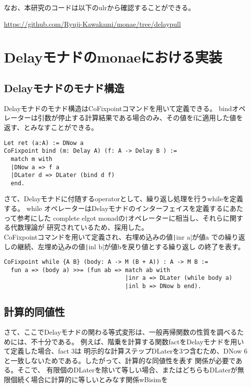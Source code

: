 \documentclass[japanese]{jssst_ppl}
\theoremstyle{definition}
\begin{document}
なお、本研究のコードは以下のulrから確認することができる。\\

\begin{center}
  \url{https://github.com/Ryuji-Kawakami/monae/tree/delaypull}
\end{center}


\section{Delayモナドのmonaeにおける実装}


\subsection{Delayモナドのモナド構造}

Delayモナドのモナド構造はCoFixpointコマンドを用いて定義できる。
bindオペレーターは引数が停止する計算結果である場合のみ、その値をfに適用した値を返す、とみなすことができる。
\begin{verbatim}
Let ret (a:A) := DNow a
CoFixpoint bind (m: Delay A) (f: A -> Delay B ) :=
  match m with
  |DNow a => f a
  |DLater d => DLater (bind d f)
  end.
                \end{verbatim}

さて、Delayモナドに付随するoperatorとして、繰り返し処理を行うwhileを定義する。
while オペレーターはDelayモナドのインターフェイスを定義するにあたって参考にした
complete elgot monadの$\dagger$オペレーターに相当し、それらに関する代数理論が
研究されているため、採用した。\\
CoFixpointコマンドを用いて定義され、右埋め込みの値\texttt|inr a|が値a
での繰り返しの継続、左埋め込みの値\texttt|inl b|が値bを戻り値とする繰り返し
の終了を表す。

\begin{verbatim}
CoFixpoint while {A B} (body: A -> M (B + A)) : A -> M B :=
  fun a => (body a) >>= (fun ab => match ab with
                                   |inr a => DLater (while body a)
                                   |inl b => DNow b end).
\end{verbatim}




\subsection{計算的同値性}
さて、ここでDelayモナドの関わる等式変形は、一般再帰関数の性質を調べるためには、不十分である。
例えば、階乗を計算する関数factをDelayモナドを用いて定義した場合、fact 3は
明示的な計算ステップDLaterを3つ含むため、DNow 6と一致しないためである。したがって、計算的な同値性を表す
関係が必要である。そこで、
有限個のDLaterを除いて等しい場合、またはどちらもDLaterが無限個続く場合に計算的に等しいとみなす関係wBisimを
\end{document}
